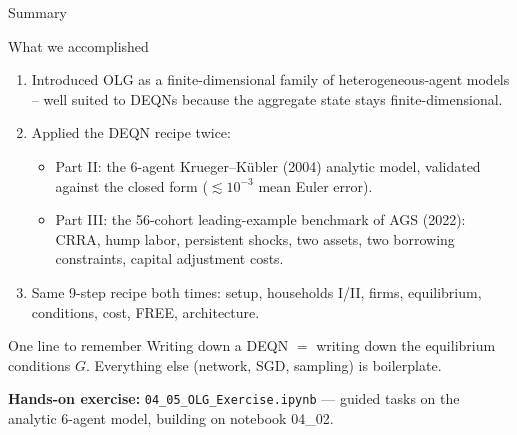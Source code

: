 \documentclass[aspectratio=169,11pt]{beamer}
\newcommand{\emphc}[1]{\textcolor{harvardcrimson}{#1}}
\begin{document}
\begin{frame}[shrink=8]{Summary}
\footnotesize
\begin{block}{What we accomplished}
\vspace{-2pt}\begin{enumerate}\itemsep1pt
    \item Introduced OLG as a finite-dimensional family of heterogeneous-agent models -- well suited to DEQNs because the aggregate state stays finite-dimensional.
    \item Applied the DEQN recipe \emphc{twice}:
    \begin{itemize}\itemsep0pt
        \item \emphc{Part II:} the 6-agent Krueger--K\"ubler (2004) analytic model, validated against the closed form ($\lesssim 10^{-3}$ mean Euler error).
        \item \emphc{Part III:} the 56-cohort leading-example benchmark of AGS (2022): CRRA, hump labor, persistent shocks, two assets, two borrowing constraints, capital adjustment costs.
    \end{itemize}
    \item \emphc{Same 9-step recipe} both times: setup, households I/II, firms, equilibrium, conditions, cost, FREE, architecture.
\end{enumerate}
\end{block}

\vspace{-2pt}
\begin{alertblock}{One line to remember}
\emphc{Writing down a DEQN $=$ writing down the equilibrium conditions $G$.}  Everything else (network, SGD, sampling) is boilerplate.
\end{alertblock}

\vspace{0.2em}
{\footnotesize \textbf{Hands-on exercise:} \texttt{04\_05\_OLG\_Exercise.ipynb} --- guided tasks on the analytic 6-agent model, building on notebook 04\_02.}
\end{frame}
\end{document}
